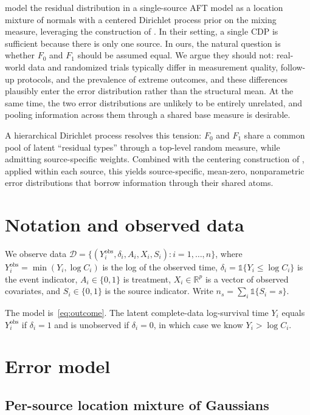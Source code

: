 \documentclass[11pt]{article}
\theoremstyle{plain}
\theoremstyle{definition}
\theoremstyle{remark}
\newcommand{\1}{\mathds{1}}
\newcommand{\R}{\mathbb{R}}
\begin{document}
\citet{henderson2020individualized} model the residual distribution in a single-source AFT model as a location mixture of normals with a centered Dirichlet process prior on the mixing measure, leveraging the construction of \citet{yang2010semiparametric}. In their setting, a single CDP is sufficient because there is only one source. In ours, the natural question is whether $F_0$ and $F_1$ should be assumed equal. We argue they should not: real-world data and randomized trials typically differ in measurement quality, follow-up protocols, and the prevalence of extreme outcomes, and these differences plausibly enter the error distribution rather than the structural mean. At the same time, the two error distributions are unlikely to be entirely unrelated, and pooling information across them through a shared base measure is desirable.

A hierarchical Dirichlet process \citep{teh2006hierarchical} resolves this tension: $F_0$ and $F_1$ share a common pool of latent ``residual types'' through a top-level random measure, while admitting source-specific weights. Combined with the centering construction of \citet{yang2010semiparametric}, applied within each source, this yields source-specific, mean-zero, nonparametric error distributions that borrow information through their shared atoms.

\section{Notation and observed data}

We observe data $\mathcal{D} = \{(Y_i^{\mathrm{obs}}, \delta_i, A_i, X_i, S_i) : i = 1, \ldots, n\}$, where $Y_i^{\mathrm{obs}} = \min(Y_i, \log C_i)$ is the log of the observed time, $\delta_i = \1\{Y_i \le \log C_i\}$ is the event indicator, $A_i \in \{0, 1\}$ is treatment, $X_i \in \R^p$ is a vector of observed covariates, and $S_i \in \{0, 1\}$ is the source indicator. Write $n_s = \sum_i \1\{S_i = s\}$.

The model is~\eqref{eq:outcome}. The latent complete-data log-survival time $Y_i$ equals $Y_i^{\mathrm{obs}}$ if $\delta_i = 1$ and is unobserved if $\delta_i = 0$, in which case we know $Y_i > \log C_i$.

\section{Error model}

\subsection{Per-source location mixture of Gaussians}
\end{document}
